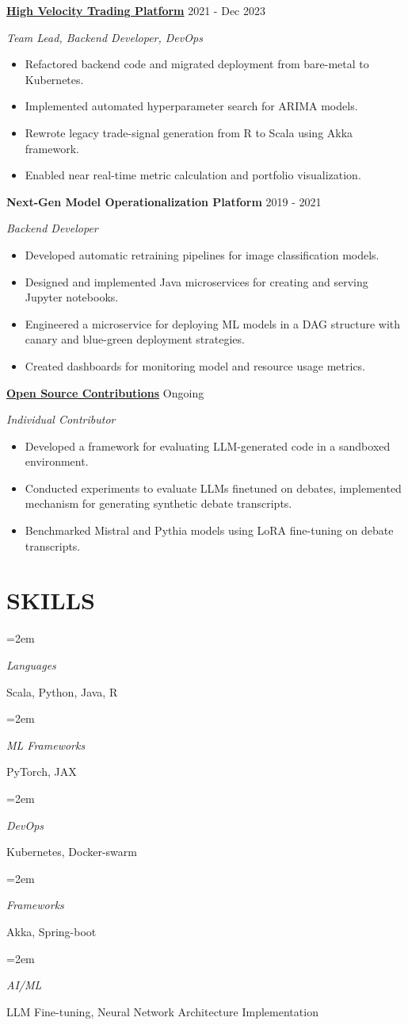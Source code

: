 \documentclass[fontsize=11pt]{article}
\newlength{\spacebox}
\newcommand{\sepspace}{\vspace*{1em}}
\newcommand{\NewPart}[1]{\section*{\uppercase{#1}}}
\newcommand{\SkillsEntry}[2]{
    \noindent\hangindent=2em\hangafter=0
    \parbox{\spacebox}{\textit{#1}}
    \hspace{1.5em} #2 \par}
\newcommand{\ProjectEntry}[4]{
    \noindent \textbf{#1} \hfill {#2} \par
    \noindent \textit{#3} \par
    \noindent \small #4
    \normalsize \par}
\begin{document}
\sepspace

\ProjectEntry{\href{https://tplusone.org}{High Velocity Trading Platform}}{2021 - Dec 2023}{Team Lead, Backend Developer, DevOps}
{%
\begin{itemize}
\item Refactored backend code and migrated deployment from bare-metal to Kubernetes.
\item Implemented automated hyperparameter search for ARIMA models.
\item Rewrote legacy trade-signal generation from R to Scala using Akka framework.
\item Enabled near real-time metric calculation and portfolio visualization.
\end{itemize}}

\sepspace

\ProjectEntry{Next-Gen Model Operationalization Platform}{2019 - 2021}{Backend Developer}
{%
\begin{itemize}
\item Developed automatic retraining pipelines for image classification models.
\item Designed and implemented Java microservices for creating and serving Jupyter notebooks.
\item Engineered a microservice for deploying ML models in a DAG structure with canary and blue-green deployment strategies.
\item Created dashboards for monitoring model and resource usage metrics.
\end{itemize}}

\sepspace

\ProjectEntry{\href{https://github.com/rokosbasilisk/code-eval-harness}{Open Source Contributions}}{Ongoing}{Individual Contributor}
{%
\begin{itemize}
\item Developed a framework for evaluating LLM-generated code in a sandboxed environment.
\item Conducted experiments to evaluate LLMs finetuned on debates, implemented mechanism for generating synthetic debate transcripts.
\item Benchmarked Mistral and Pythia models using LoRA fine-tuning on debate transcripts.
\end{itemize}}

\NewPart{SKILLS}
\SkillsEntry{Languages}{Scala, Python, Java, R}
\SkillsEntry{ML Frameworks}{PyTorch, JAX}
\SkillsEntry{DevOps}{Kubernetes, Docker-swarm}
\SkillsEntry{Frameworks}{Akka, Spring-boot}
\SkillsEntry{AI/ML}{LLM Fine-tuning, Neural Network Architecture Implementation}
\end{document}
